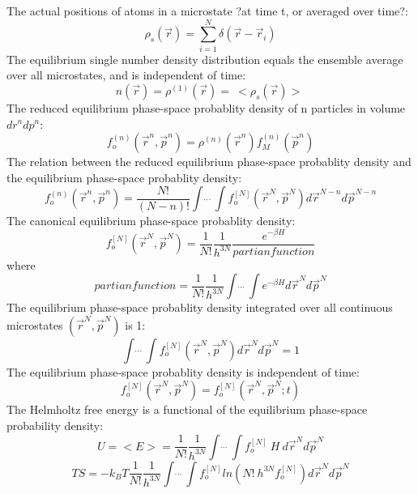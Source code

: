 \documentclass[double,12pt]{beavtex}
\begin{document}
The actual positions of atoms in a microstate  \color{red}?at time t, or averaged over time?:\color{black}
\begin{equation}\rho_{s}(\vec r)=\sum_{i=1}^N\delta(\vec r - \vec r_i)\end{equation}
The equilibrium single number density distribution equals the ensemble average over all microstates, and is independent of time:
\begin{equation}n(\vec r)=\rho^{(1)}(\vec r)=~<\rho_s(\vec r)>~\end{equation}
The reduced equilibrium phase-space probablity density of n particles in volume $dr^ndp^n$:
\begin{equation}f_o^{(n)}(\vec r^n, \vec p^n)=\rho^{(n)}(\vec r^n)f_M^{(n)}(\vec p^n)\end{equation}
The relation between the  reduced equilibrium phase-space probablity density and the equilibrium phase-space probablity density:
\begin{equation}f_o^{(n)}(\vec r^n, \vec p^n)=\frac{N!}{(N-n)!}\int\dot~\dot~\dot~\int f_o^{[N]}(\vec r^N, \vec p^N) d\vec r^{N-n} d\vec p^{N-n}\end{equation}
The canonical equilibrium phase-space probablity density:
\begin{equation}f_o^{[N]}(\vec r^N, \vec p^N)=\frac{1}{N!}\frac{1}{h^{3N}}\frac{e^{-\beta H}}{partian function}\end{equation}
where
\begin{equation}{partian function}=\frac{1}{N!}\frac{1}{h^{3N}}\int\dot~\dot~\dot~\int e^{-\beta H} d\vec r^{N} d\vec p^{N}\end{equation}
The equilibrium phase-space probablity density integrated over all continuous microstates $(\vec r^N,\vec p^N)$ is 1:
\begin{equation}\int\dot~\dot~\dot~\int f_o^{[N]}(\vec r^N, \vec p^N) d\vec r^{N} d\vec p^{N}=1\end{equation}
The equilibrium phase-space probablity density is independent of time:
\begin{equation}f_o^{[N]}(\vec r^N, \vec p^N) = f_o^{[N]}(\vec r^N, \vec p^N; t)\end{equation}
The Helmholtz free energy is a functional of the equilibrium phase-space probability density:
\begin{equation}U = <E> = \frac{1}{N!}\frac{1}{h^{3N}}\int\dot~\dot~\dot~\int f_o^{[N]}~H~d\vec r^{N} d\vec p^{N}\end{equation}
\begin{equation}TS = -k_BT\frac{1}{N!}\frac{1}{h^{3N}}\int\dot~\dot~\dot~\int f_o^{[N]}ln\left(N!~h^{3N}f_o^{[N]}\right) d\vec r^{N} d\vec p^{N} \end{equation}
\end{document}
